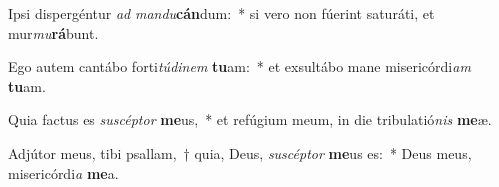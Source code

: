 \item Ipsi dispergéntur \textit{ad} \textit{man}\textit{du}\textbf{cán}dum:~* si vero non fúerint saturáti, et mur\textit{mu}\textbf{rá}bunt.
\item Ego autem cantábo forti\textit{tú}\textit{di}\textit{nem} \textbf{tu}am:~* et exsultábo mane misericórdi\textit{am} \textbf{tu}am.
\item Quia factus es \textit{su}\textit{scép}\textit{tor} \textbf{me}us,~* et refúgium meum, in die tribulatió\textit{nis} \textbf{me}æ.
\item Adjútor meus, tibi psallam,~† quia, Deus, \textit{su}\textit{scép}\textit{tor} \textbf{me}us es:~* Deus meus, misericórdi\textit{a} \textbf{me}a.
